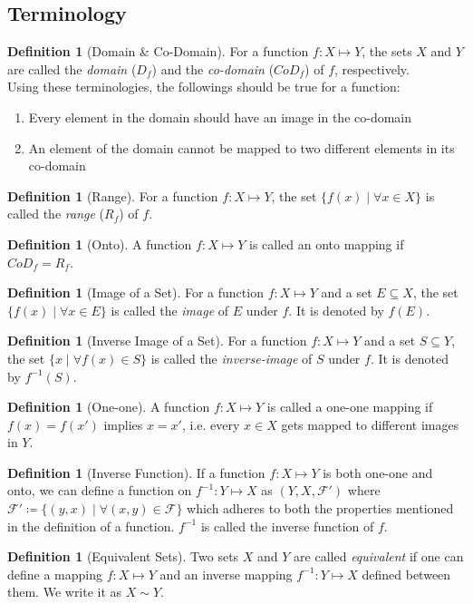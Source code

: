 \documentclass{report}
\theoremstyle{plain}
\theoremstyle{definition}
\newtheorem{definition}[theorem]{Definition} %
\begin{document}
\subsection{Terminology}
\begin{definition}[Domain \& Co-Domain]
For a function $f:X\mapsto Y$, the sets $X$ and $Y$ are called the \emph{domain} ($D_f$) and the \emph{co-domain} ($CoD_f$) of $f$, respectively.
\\
Using these terminologies, the followings should be true for a function: 
\begin{enumerate}
\item Every element in the domain should have an image in the co-domain
\item An element of the domain cannot be mapped to two different elements in its co-domain
\end{enumerate}
\end{definition}
\begin{definition}[Range]
For a function $f:X\mapsto Y$, the set $\{f(x)\mid \forall x\in X\}$ is called the \emph{range} ($R_f$) of $f$.
\end{definition}
\begin{definition}[Onto]
A function $f:X\mapsto Y$ is called an onto mapping if $CoD_f=R_f$.
\end{definition}
\begin{definition}[Image of a Set]
For a function $f:X\mapsto Y$ and a set $E\subseteq X$, the set $\{f(x)\mid \forall x\in E\}$ is called the \emph{image} of $E$ under $f$. It is denoted by $f(E)$.
\end{definition}
\begin{definition}[Inverse Image of a Set]
For a function $f:X\mapsto Y$ and a set $S\subseteq Y$, the set $\{x\mid \forall f(x)\in S\}$ is called the \emph{inverse-image} of $S$ under $f$. It is denoted by $f^{-1}(S)$.
\end{definition}
\begin{definition}[One-one]
A function $f:X\mapsto Y$ is called a one-one mapping if $f(x)=f(x')$ implies $x=x'$, i.e. every $x\in X$ gets mapped to different images in $Y$.
\end{definition}
\begin{definition}[Inverse Function]
If a function $f:X\mapsto Y$ is both one-one and onto, we can define a function on $f^{-1}:Y\mapsto X$ as $(Y,X,\mathcal{F}')$ where $\mathcal{F}'\coloneqq\{(y,x)\mid \forall(x,y)\in\mathcal{F}\}$ which adheres to both the properties mentioned in the definition of a function. $f^{-1}$ is called the inverse function of $f$.
\end{definition}
\begin{definition}[Equivalent Sets]
Two sets $X$ and $Y$ are called \emph{equivalent} if one can define a mapping $f:X\mapsto Y$ and an inverse mapping $f^{-1}:Y\mapsto X$ defined between them. We write it as $X\sim Y$.
\end{definition}
\end{document}
